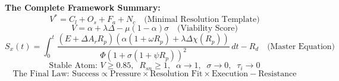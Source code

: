 \documentclass[12pt, openany]{book}
\theoremstyle{thmstyle}
\theoremstyle{defstyle}
\begin{document}
\begin{equationbox}
\textbf{The Complete Framework Summary:}
\[
V^* = C_l + O_s + F_a + N_c \quad \text{(Minimal Resolution Template)}
\]
\[
V = \alpha + \lambda\Delta - \mu(1-\alpha)\sigma \quad \text{(Viability Score)}
\]
\[
S_x(t) = \int_0^t \frac{(E+\Delta A_r R_p)(\alpha(1+\omega R_p)+\lambda\Delta\chi(R_p))}{\Phi(1+\sigma(1+\psi R_p))^2}\,dt - R_d \quad \text{(Master Equation)}
\]
\[
\text{Stable Atom: } V \geq 0.85, \;\; R_{sn} \geq 1, \;\; \alpha \to 1, \;\; \sigma \to 0, \;\; \tau_i \to 0
\]
\[
\text{The Final Law: } \text{Success} \propto \text{Pressure} \times \text{Resolution Fit} \times \text{Execution} - \text{Resistance}
\]
\end{equationbox}
\end{document}
